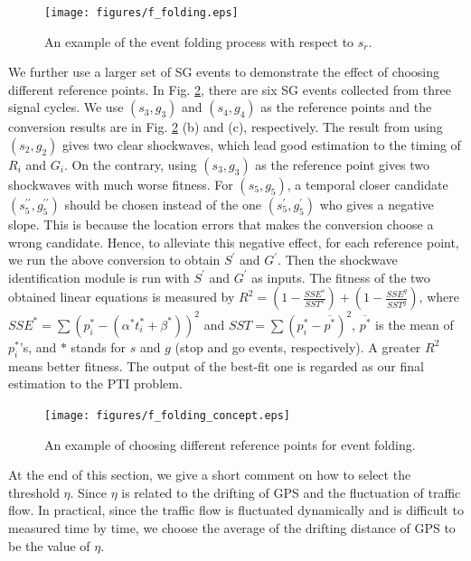 \documentclass[final,oneside,onecolumn,12pt,a4paper]{book}%
\begin{document}
\begin{figure}[pth]
\centerline{\texttt{[image: figures/f\_folding.eps]}} \hfill\caption{An example of the event folding
process with respect to $s_{r}$.}%
\label{fig:f_folding}%
\end{figure}

We further use a larger set of SG events to demonstrate the effect of choosing
different reference points. In Fig. \ref{fig:f_folding_concept}, there are six
SG events collected from three signal cycles. We use $\left(  s_{3}%
,g_{3}\right)  $ and $\left(  s_{4},g_{4}\right)  $ as the reference points
and the conversion results are in Fig. \ref{fig:f_folding_concept} (b) and
(c), respectively. The result from using $\left(  s_{2},g_{2}\right)  $ gives
two clear shockwaves, which lead good estimation to the timing of $R_{i}$ and
$G_{i}$. On the contrary, using $\left(  s_{3},g_{3}\right)  $ as the
reference point gives two shockwaves with much worse fitness. For $\left(
s_{5},g_{5}\right)  $, a temporal closer candidate $\left(  s_{5}%
^{\prime\prime},g_{5}^{\prime\prime}\right)  $ should be chosen instead of the
one $\left(  s_{5}^{\prime},g_{5}^{\prime}\right)  $ who gives a negative
slope. This is because the location errors that makes the conversion choose a
wrong candidate. Hence, to alleviate this negative effect, for each reference
point, we run the above conversion to obtain $S^{\prime}$ and $G^{\prime}$.
Then the shockwave identification module is run with $S^{\prime}$ and
$G^{\prime}$ as inputs. The fitness of the two obtained linear equations is
measured by $R^{2}=\left(  1-\frac{SSE^{s}}{SST^{s}}\right)  +\left(
1-\frac{SSE^{g}}{SST^{g}}\right)  $, where $SSE^{\ast}=\sum\left(  p_{i}%
^{\ast}-\left(  \alpha^{\ast}t_{i}^{\ast}+\beta^{\ast}\right)  \right)  ^{2}$
and $SST=\sum\left(  p_{i}^{\ast}-\overline{p^{\ast}}\right)  ^{2}$,
$\overline{p^{\ast}}$ is the mean of $p_{i}^{\ast}$'s, and $\ast$ stands for
$s$ and $g$ (stop and go events, respectively). A greater $R^{2}$ means better
fitness. The output of the best-fit one is regarded as our final estimation to
the PTI problem.

\begin{figure}[pth]
\centerline{\texttt{[image: figures/f\_folding\_concept.eps]}} \hfill\caption{An example of choosing
different reference points for event folding.}%
\label{fig:f_folding_concept}%
\end{figure}

At the end of this section, we give a short comment on how to select the
threshold $\eta$. Since $\eta$ is related to the drifting of GPS and the
fluctuation of traffic flow. In practical, since the traffic flow is
fluctuated dynamically and is difficult to measured time by time, we choose
the average of the drifting distance of GPS to be the value of $\eta$.
\end{document}
